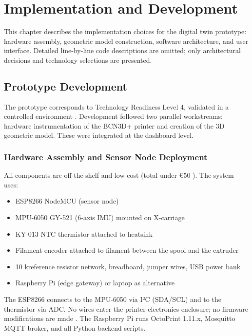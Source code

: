 \chapter{Implementation and Development}
\label{chap:chapter4}

This chapter describes the implementation choices for the digital twin prototype: hardware assembly, geometric model construction, software architecture, and user interface. Detailed line-by-line code descriptions are omitted; only architectural decisions and technology selections are presented.

\section{Prototype Development}

The prototype corresponds to Technology Readiness Level 4, validated in a controlled environment \cite{ec2017trl}. Development followed two parallel workstreams: hardware instrumentation of the BCN3D+ printer and creation of the 3D geometric model. These were integrated at the dashboard level.

\subsection{Hardware Assembly and Sensor Node Deployment}

All components are off-the-shelf and low-cost (total under €50 \cite{shomenov2025}). The system uses:
\begin{itemize}
    \item ESP8266 NodeMCU (sensor node)
    \item MPU-6050 GY-521 (6-axis IMU) mounted on X-carriage
    \item KY-013 NTC thermistor attached to heatsink
    \item Filament encoder attached to filament between the spool and the extruder
    \item 10 k\Omega reference resistor network, breadboard, jumper wires, USB power bank
    \item Raspberry Pi (edge gateway) or laptop as alternative
\end{itemize}

The ESP8266 connects to the MPU-6050 via I²C (SDA/SCL) and to the thermistor via ADC. No wires enter the printer electronics enclosure; no firmware modifications are made \cite{esp8266_trm}. The Raspberry Pi runs OctoPrint 1.11.x, Mosquitto MQTT broker, and all Python backend scripts.

